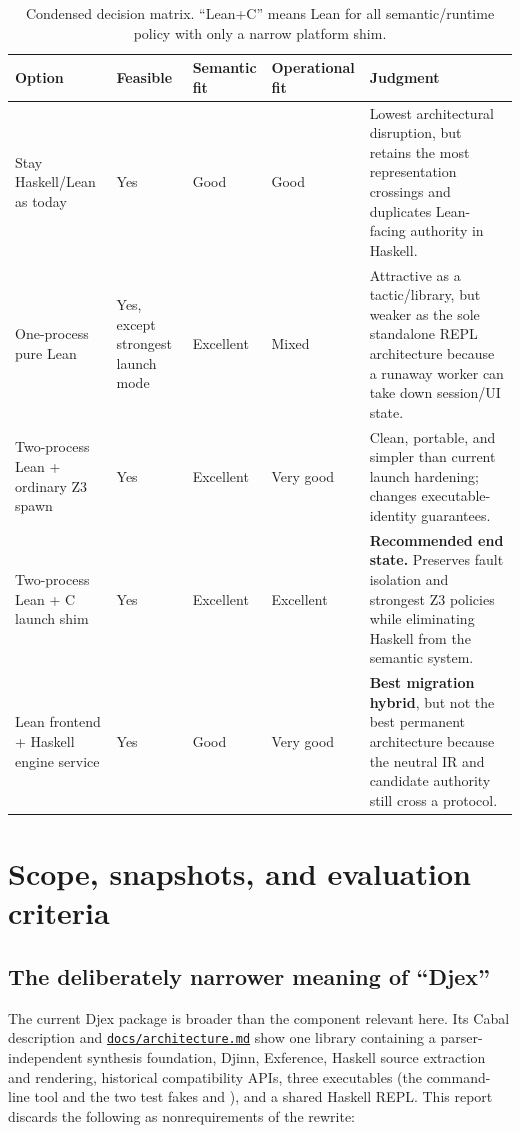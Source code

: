 \documentclass[10pt,letterpaper,oneside]{report}
\newcommand{\code}[1]{\texttt{\detokenize{#1}}}
\def\DjexBase{https://github.com/VladimirReshetnikov/Djex/blob/43ec4f70b7540bbb76cb1bb72d9e5c4329cafe7f/}
\newcommand{\dpath}[1]{\href{\DjexBase#1}{\nolinkurl{#1}}}
\begin{document}
\begin{table}[H]
\centering
\caption{Condensed decision matrix. ``Lean+C'' means Lean for all semantic/runtime policy with only a narrow platform shim.}
\begin{tabularx}{\textwidth}{@{}L{0.25\textwidth}C{0.13\textwidth}C{0.14\textwidth}C{0.14\textwidth}Y@{}}
\toprule
\textbf{Option} & \textbf{Feasible} & \textbf{Semantic fit} & \textbf{Operational fit} & \textbf{Judgment} \\
\midrule
Stay Haskell/Lean as today & Yes & Good & Good & Lowest architectural disruption, but retains the most representation crossings and duplicates Lean-facing authority in Haskell. \\
One-process pure Lean & Yes, except strongest launch mode & Excellent & Mixed & Attractive as a tactic/library, but weaker as the sole standalone REPL architecture because a runaway worker can take down session/UI state. \\
Two-process Lean + ordinary Z3 spawn & Yes & Excellent & Very good & Clean, portable, and simpler than current launch hardening; changes executable-identity guarantees. \\
Two-process Lean + C launch shim & Yes & Excellent & Excellent & \textbf{Recommended end state.} Preserves fault isolation and strongest Z3 policies while eliminating Haskell from the semantic system. \\
Lean frontend + Haskell engine service & Yes & Good & Very good & \textbf{Best migration hybrid}, but not the best permanent architecture because the neutral IR and candidate authority still cross a protocol. \\
\bottomrule
\end{tabularx}
\end{table}

\chapter{Scope, snapshots, and evaluation criteria}\label{ch:scope}

\section{The deliberately narrower meaning of ``Djex''}

The current Djex package is broader than the component relevant here. Its Cabal description and \dpath{docs/architecture.md} show one library containing a parser-independent synthesis foundation, Djinn, Exference, Haskell source extraction and rendering, historical compatibility APIs, three executables (the \code{djex} command-line tool and the two test fakes \code{djex-fake-cabal} and \code{djex-fake-z3}), and a shared Haskell REPL. This report discards the following as nonrequirements of the rewrite:
\end{document}
